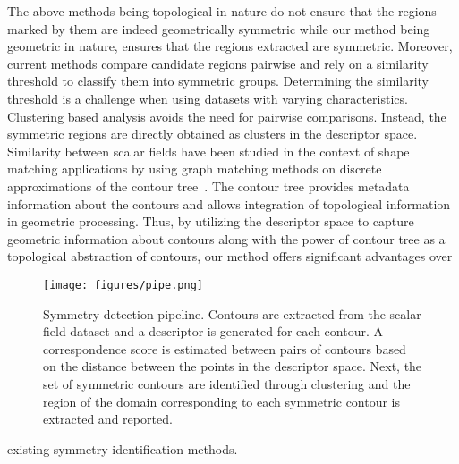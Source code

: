 \documentclass[review,journal]{vgtc}         %
\begin{document}
The above methods being topological in nature do not ensure that the regions marked by
them are indeed geometrically symmetric while our method being geometric in nature, 
ensures that the regions extracted are symmetric. Moreover, current methods compare candidate regions 
pairwise and rely on a similarity threshold to classify them into symmetric groups. Determining
the similarity threshold is a challenge when using datasets with varying characteristics.
Clustering based analysis avoids the need for pairwise comparisons. Instead, the symmetric regions
are directly obtained as clusters in the descriptor space. 
Similarity between scalar fields have been
studied in the context of shape matching applications by using graph matching methods on 
discrete approximations of the contour tree~\cite{ZhangBKDNB06,HilagaSKK01}.
The contour tree provides metadata information about the contours
and allows integration of topological information in geometric processing. Thus, by utilizing 
the descriptor space to capture geometric information about contours along with the power of contour 
tree as a topological abstraction of contours, our method offers significant advantages over 
\begin{figure*}[t]
	\centering
		\texttt{[image: figures/pipe.png]}
	\caption{\label{pipeline} Symmetry detection pipeline. Contours are extracted
		from the scalar field dataset and a descriptor is generated for each contour.
		A correspondence score is estimated between pairs of contours based on the
		distance between the points in the descriptor space. Next, the set of symmetric
		contours are identified through clustering and the region of the domain corresponding
	to each symmetric contour is extracted and reported.}
\end{figure*}
existing symmetry identification methods. 
\end{document}

